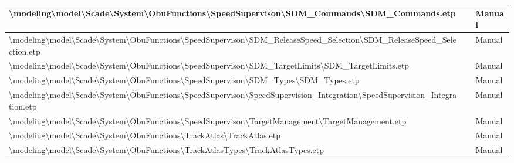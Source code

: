 \begin{longtable}{|>{\RaggedRight}p{}|>{\RaggedRight}p{}|>{\RaggedRight}p{}|}
\hline
\textbackslash modeling\textbackslash \allowbreak model\textbackslash \allowbreak Scade\textbackslash \allowbreak System\textbackslash \allowbreak ObuFunctions\textbackslash \allowbreak SpeedSupervison\textbackslash \allowbreak SDM\_\allowbreak Commands\textbackslash \allowbreak SDM\_\allowbreak Commands.etp& &Manual\\
\hline
\textbackslash modeling\textbackslash \allowbreak model\textbackslash \allowbreak Scade\textbackslash \allowbreak System\textbackslash \allowbreak ObuFunctions\textbackslash \allowbreak SpeedSupervison\textbackslash \allowbreak SDM\_\allowbreak ReleaseSpeed\_\allowbreak Selection\textbackslash \allowbreak SDM\_\allowbreak ReleaseSpeed\_\allowbreak Selection.etp& &Manual\\
\hline
\textbackslash modeling\textbackslash \allowbreak model\textbackslash \allowbreak Scade\textbackslash \allowbreak System\textbackslash \allowbreak ObuFunctions\textbackslash \allowbreak SpeedSupervison\textbackslash \allowbreak SDM\_\allowbreak TargetLimits\textbackslash \allowbreak SDM\_\allowbreak TargetLimits.etp& &Manual\\
\hline
\textbackslash modeling\textbackslash \allowbreak model\textbackslash \allowbreak Scade\textbackslash \allowbreak System\textbackslash \allowbreak ObuFunctions\textbackslash \allowbreak SpeedSupervison\textbackslash \allowbreak SDM\_\allowbreak Types\textbackslash \allowbreak SDM\_\allowbreak Types.etp& &Manual\\
\hline
\textbackslash modeling\textbackslash \allowbreak model\textbackslash \allowbreak Scade\textbackslash \allowbreak System\textbackslash \allowbreak ObuFunctions\textbackslash \allowbreak SpeedSupervison\textbackslash \allowbreak SpeedSupervision\_\allowbreak Integration\textbackslash \allowbreak SpeedSupervision\_\allowbreak Integration.etp& &Manual\\
\hline
\textbackslash modeling\textbackslash \allowbreak model\textbackslash \allowbreak Scade\textbackslash \allowbreak System\textbackslash \allowbreak ObuFunctions\textbackslash \allowbreak SpeedSupervison\textbackslash \allowbreak TargetManagement\textbackslash \allowbreak TargetManagement.etp& &Manual\\
\hline
\textbackslash modeling\textbackslash \allowbreak model\textbackslash \allowbreak Scade\textbackslash \allowbreak System\textbackslash \allowbreak ObuFunctions\textbackslash \allowbreak TrackAtlas\textbackslash \allowbreak TrackAtlas.etp& &Manual\\
\hline
\textbackslash modeling\textbackslash \allowbreak model\textbackslash \allowbreak Scade\textbackslash \allowbreak System\textbackslash \allowbreak ObuFunctions\textbackslash \allowbreak TrackAtlasTypes\textbackslash \allowbreak TrackAtlasTypes.etp& &Manual\\

\end{longtable}
